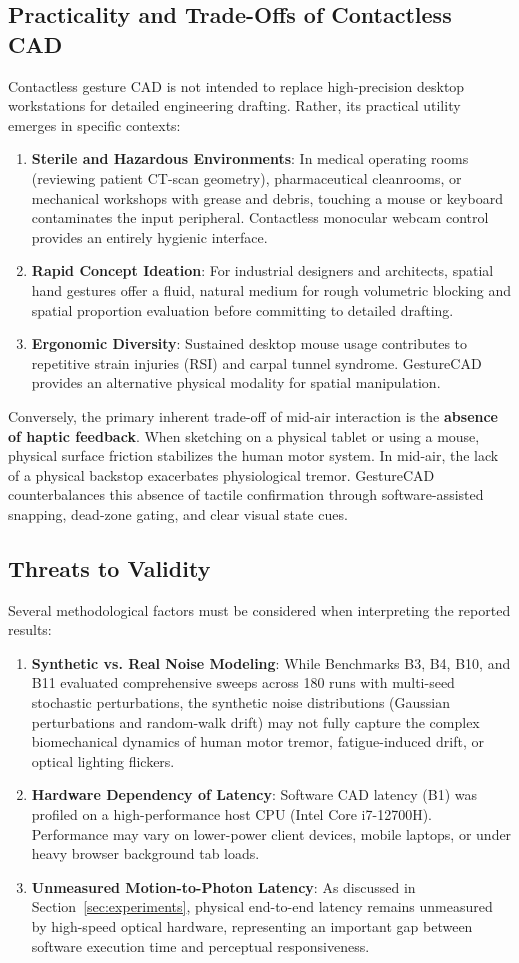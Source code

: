 \subsection{Practicality and Trade-Offs of Contactless CAD}
Contactless gesture CAD is not intended to replace high-precision desktop workstations for detailed engineering drafting. Rather, its practical utility emerges in specific contexts:
\begin{enumerate}
    \item \textbf{Sterile and Hazardous Environments}: In medical operating rooms (reviewing patient CT-scan geometry), pharmaceutical cleanrooms, or mechanical workshops with grease and debris, touching a mouse or keyboard contaminates the input peripheral. Contactless monocular webcam control provides an entirely hygienic interface.
    \item \textbf{Rapid Concept Ideation}: For industrial designers and architects, spatial hand gestures offer a fluid, natural medium for rough volumetric blocking and spatial proportion evaluation before committing to detailed drafting.
    \item \textbf{Ergonomic Diversity}: Sustained desktop mouse usage contributes to repetitive strain injuries (RSI) and carpal tunnel syndrome. GestureCAD provides an alternative physical modality for spatial manipulation.
\end{enumerate}
Conversely, the primary inherent trade-off of mid-air interaction is the \textbf{absence of haptic feedback}. When sketching on a physical tablet or using a mouse, physical surface friction stabilizes the human motor system. In mid-air, the lack of a physical backstop exacerbates physiological tremor. GestureCAD counterbalances this absence of tactile confirmation through software-assisted snapping, dead-zone gating, and clear visual state cues.

\subsection{Threats to Validity}
Several methodological factors must be considered when interpreting the reported results:
\begin{enumerate}
    \item \textbf{Synthetic vs. Real Noise Modeling}: While Benchmarks B3, B4, B10, and B11 evaluated comprehensive sweeps across 180 runs with multi-seed stochastic perturbations, the synthetic noise distributions (Gaussian perturbations and random-walk drift) may not fully capture the complex biomechanical dynamics of human motor tremor, fatigue-induced drift, or optical lighting flickers.
    \item \textbf{Hardware Dependency of Latency}: Software CAD latency (B1) was profiled on a high-performance host CPU (Intel Core i7-12700H). Performance may vary on lower-power client devices, mobile laptops, or under heavy browser background tab loads.
    \item \textbf{Unmeasured Motion-to-Photon Latency}: As discussed in Section~\ref{sec:experiments}, physical end-to-end latency remains unmeasured by high-speed optical hardware, representing an important gap between software execution time and perceptual responsiveness.
\end{enumerate}
